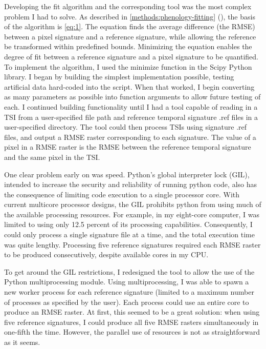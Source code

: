 Developing the fit algorithm and the corresponding tool was the most complex problem I had to solve. As described in \autoref{methods:phenology-fitting} (), the basis of the algorithm is \autoref{eq:1}. The equation finds the average difference (the RMSE) between a pixel signature and a reference signature, while allowing the reference be transformed within predefined bounds. Minimizing the equation enables the degree of fit between a reference signature and a pixel signature to be quantified. To implement the algorithm, I used the minimize function in the Scipy Python library. I began by building the simplest implementation possible, testing artificial data hard-coded into the script. When that worked, I begin converting as many parameters as possible into function arguments to allow future testing of each. I continued building functionality until I had a tool capable of reading in a TSI from a user-specified file path and reference temporal signature .ref files in a user-specified directory. The tool could then process TSIs using signature .ref files, and output a RMSE raster corresponding to each signature. The value of a pixel in a RMSE raster is the RMSE between the reference temporal signature and the same pixel in the TSI.

One clear problem early on was speed. Python’s global interpreter lock (GIL), intended to increase the security and reliability of running python code, also has the consequence of limiting code execution to a single processor core. With current multicore processor designs, the GIL prohibits python from using much of the available processing resources. For example, in my eight-core computer, I was limited to using only 12.5 percent of its processing capabilities. Consequently, I could only process a single signature file at a time, and the total execution time was quite lengthy. Processing five reference signatures required each RMSE raster to be produced consecutively, despite available cores in my CPU.

To get around the GIL restrictions, I redesigned the tool to allow the use of the Python multiprocessing module. Using multiprocessing, I was able to spawn a new worker process for each reference signature (limited to a maximum number of processes as specified by the user). Each process could use an entire core to produce an RMSE raster. At first, this seemed to be a great solution: when using five reference signatures, I could produce all five RMSE rasters simultaneously in one-fifth the time. However, the parallel use of resources is not as straightforward as it seems.

